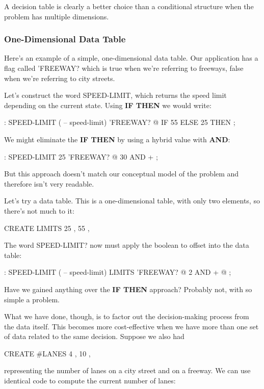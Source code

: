 A decision table is clearly a better choice than a conditional structure
when the problem has multiple dimensions.

\subsubsection{One-Dimensional Data Table}

Here's an example of a simple, one-dimensional data table. Our application
has a flag called 'FREEWAY? which is true when we're referring to
freeways, false when we're referring to city streets.

Let's construct the word SPEED-LIMIT, which returns the speed
limit depending on the current state. Using \textbf{IF THEN} we would write:

\begin{Code}
: SPEED-LIMIT  ( -- speed-limit)
     'FREEWAY? @  IF  55  ELSE  25  THEN ;
\end{Code}
We might eliminate the \textbf{IF THEN} by using a hybrid value with \textbf{AND}:

\begin{Code}
: SPEED-LIMIT   25  'FREEWAY? @  30 AND + ;
\end{Code}
But this approach doesn't match our conceptual model of the problem
and therefore isn't very readable.

Let's try a data table. This is a one-dimensional table, with only two
elements, so there's not much to it:

\begin{Code}
CREATE LIMITS   25 ,  55 ,
\end{Code}
The word SPEED-LIMIT? now must apply the boolean to offset into
the data table:

\begin{Code}
: SPEED-LIMIT  ( -- speed-limit)
     LIMITS  'FREEWAY? @  2 AND  +  @ ;
\end{Code}
Have we gained anything over the \textbf{IF THEN} approach? Probably not,
with so simple a problem.

What we have done, though, is to factor out the decision-making
process from the data itself. This becomes more cost-effective when we
have more than one set of data related to the same decision. Suppose we
also had

\begin{Code}
CREATE #LANES   4 ,  10 ,
\end{Code}
representing the number of lanes on a city street and on a freeway. We
can use identical code to compute the current number of lanes:

